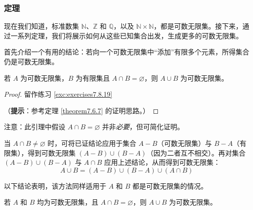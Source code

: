 \subsubsection*{定理}

现在我们知道，标准数集 $\mathbb{N}$、$\mathbb{Z}$ 和 $\mathbb{Q}$，以及 $\mathbb{N} \times \mathbb{N}$，都是可数无限集。接下来，通过一系列定理，我们将展示如何从这些已知集合出发，生成更多的可数无限集。

首先介绍一个有用的结论：若向一个可数无限集中``添加''有限多个元素，所得集合仍是可数无限集。

\begin{lemma}\label{lemma7.6.16}
    若 $A$ 为可数无限集，$B$ 为有限集且 $A \cap B = \varnothing$，则 $A \cup B$ 为可数无限集。
\end{lemma}

\begin{proof}
    留作练习 \ref{exc:exercises7.8.19}

    （\textbf{提示}：参考定理 \ref{theorem7.6.7} 的证明思路。）
\end{proof}

\begin{remark}
    注意：此引理中假设 $A \cap B = \varnothing$ 并非\emph{必要}，但可简化证明。

    当 $A \cap B \ne \varnothing$ 时，可将已证结论应用于集合 $A - B$（可数无限集）与 $B - A$（有限集），得到可数无限集 $(A - B) \cup (B - A)$（因为二者互不相交）。再对集合 $(A - B) \cup (B - A)$ 与 $A \cap B$ 应用上述结论，从而得到可数无限集：
    \[A \cup B = (A - B) \cup (B - A) \cup (A \cap B)\]
\end{remark}

以下结论表明，该方法同样适用于 $A$ 和 $B$ 都是可数无限集的情况。

\begin{lemma}\label{lemma7.6.18}
    若 $A$ 和 $B$ 均为可数无限集，且 $A \cap B = \varnothing$，则 $A \cup B$ 为可数无限集。
\end{lemma}

